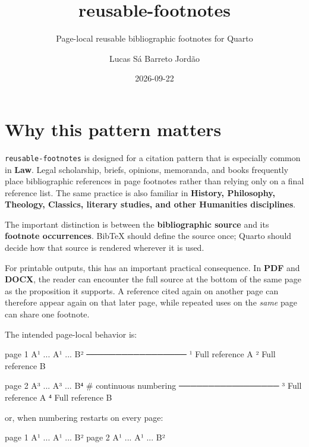 \documentclass[
  letterpaper,
  DIV=11,
  numbers=noendperiod]{scrartcl}
\title{reusable-footnotes}
\subtitle{Page-local reusable bibliographic footnotes for Quarto}
\author{Lucas Sá Barreto Jordão}
\date{2026-09-22}
\newenvironment{Shaded}{\begin{snugshade}}{\end{snugshade}}
\newcommand{\NormalTok}[1]{\textcolor[rgb]{0.00,0.23,0.31}{#1}}
\renewcommand*\contentsname{Table of contents}
\newcommand\contentsname{Table of contents}
\begin{document}
\maketitle

\renewcommand*\contentsname{Table of contents}
{
\hypersetup{linkcolor=}
\setcounter{tocdepth}{3}
\tableofcontents
}

\section{Why this pattern matters}\label{why-this-pattern-matters}

\texttt{reusable-footnotes} is designed for a citation pattern that is
especially common in \textbf{Law}. Legal scholarship, briefs, opinions,
memoranda, and books frequently place bibliographic references in page
footnotes rather than relying only on a final reference list. The same
practice is also familiar in \textbf{History, Philosophy, Theology,
Classics, literary studies, and other Humanities disciplines}.

The important distinction is between the \textbf{bibliographic source}
and its \textbf{footnote occurrences}. BibTeX should define the source
once; Quarto should decide how that source is rendered wherever it is
used.

For printable outputs, this has an important practical consequence. In
\textbf{PDF} and \textbf{DOCX}, the reader can encounter the full source
at the bottom of the same page as the proposition it supports. A
reference cited again on another page can therefore appear again on that
later page, while repeated uses on the \emph{same} page can share one
footnote.

The intended page-local behavior is:

\begin{Shaded}
\begin{Highlighting}[]
\NormalTok{page 1     A¹ ... A¹ ... B²}
\NormalTok{           ─────────────────}
\NormalTok{           ¹ Full reference A}
\NormalTok{           ² Full reference B}

\NormalTok{page 2     A³ ... A³ ... B⁴       \# continuous numbering}
\NormalTok{           ─────────────────}
\NormalTok{           ³ Full reference A}
\NormalTok{           ⁴ Full reference B}
\end{Highlighting}
\end{Shaded}

or, when numbering restarts on every page:

\begin{Shaded}
\begin{Highlighting}[]
\NormalTok{page 1     A¹ ... A¹ ... B²}
\NormalTok{page 2     A¹ ... A¹ ... B²}
\end{Highlighting}
\end{Shaded}
\end{document}
